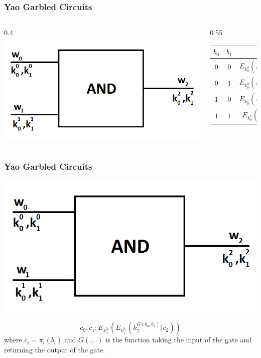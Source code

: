 \documentclass{beamer}
\begin{document}
	\begin{frame}
		\frametitle{Yao Garbled Circuits}

		\begin{columns}
			\begin{column}{0.4\textwidth}
				\includegraphics[scale=0.3]{Images/BasicGarbling}
			\end{column}

			\begin{column}{0.55\textwidth}
				\begin{tabular}[!htb]{c | c || c}
					$b_0$ & $b_1$ & \\
					\hline
					\hline
					$0$ & $0$ & $E_{k_0^0}(E_{k_1^0}(k_2^0 \Vert b_2))$\\
					\hline
					$0$ & $1$ & $E_{k_0^0}(E_{k_1^1}(k_2^0 \Vert b_2))$\\
					\hline
					$1$ & $0$ & $E_{k_0^1}(E_{k_1^0}(k_2^0 \Vert b_2))$\\
					\hline
					$1$ & $1$ & $E_{k_0^1}(E_{k_1^1}(k_2^1 \Vert ))$\\
				\end{tabular}
			\end{column}
		\end{columns}

	\end{frame}

	\begin{frame}
		\frametitle{Yao Garbled Circuits}
		\centering
		\includegraphics[scale=0.4]{Images/BasicGarbling}

		$$c_0, c_1 : E_{k_0^{b_0}}(E_{k_1^{b_1}}(k_2^{G(b_0, b_1)} \Vert c_2))$$
		where $c_i = \pi_i(b_i)$ and $G(., .)$ is the function taking the input of the gate and returning the output of the gate.
	\end{frame}
\end{document}

